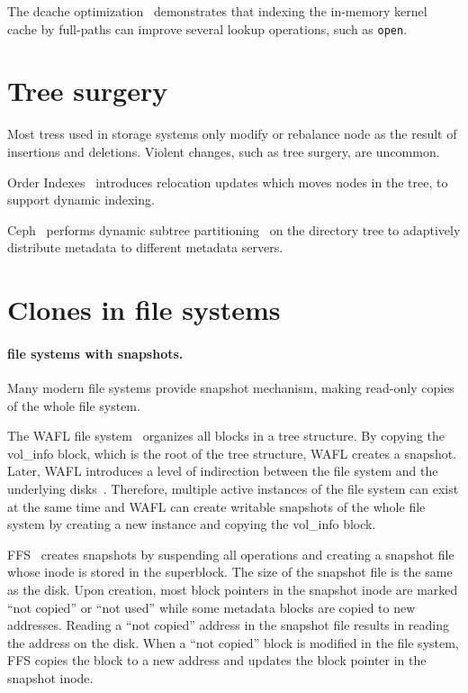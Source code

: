 The dcache optimization~\citep{dcache} demonstrates that indexing the in-memory
kernel cache by full-paths can improve several lookup operations, such as
\texttt{open}.

\section{Tree surgery}

Most tress used in storage systems only modify or rebalance node as the result
of insertions and deletions.
Violent changes, such as tree surgery, are uncommon.

Order Indexes~\citep{orderindex} introduces relocation updates which moves nodes
in the tree, to support dynamic indexing.

Ceph~\citep{ceph} performs dynamic subtree partitioning~\citep{cephtree} on the
directory tree to adaptively distribute metadata to different metadata servers.

\section{Clones in file systems}

\paragraph{file systems with snapshots.}

Many modern file systems provide snapshot mechanism, making read-only copies of
the whole file system.

The WAFL file system~\citep{wafl} organizes all blocks in a tree structure.
By copying the vol\_info block, which is the root of the tree structure, WAFL
creates a snapshot.
Later, WAFL introduces a level of indirection between the file system and the
underlying disks~\citep{wafl-flexvol}.
Therefore, multiple active instances of the file system can exist at the same
time and WAFL can create writable snapshots of the whole file system by creating
a new instance and copying the vol\_info block.

FFS~\citep{ffs} creates snapshots by suspending all operations and creating a
snapshot file whose inode is stored in the superblock.
The size of the snapshot file is the same as the disk.
Upon creation, most block pointers in the snapshot inode are marked
``not copied'' or ``not used'' while some metadata blocks are copied to new
addresses.
Reading a ``not copied'' address in the snapshot file results in reading the
address on the disk.
When a ``not copied'' block is modified in the file system, FFS copies the block
to a new address and updates the block pointer in the snapshot inode.

